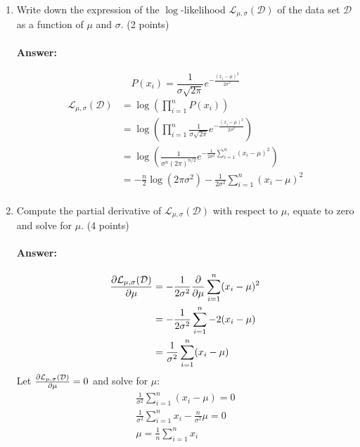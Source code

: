 \documentclass[10pt]{article}
\begin{document}
\begin{enumerate}
  \item Write down the expression of the $\log$-likelihood $\mathcal{L}_{\mu, \sigma}(\mathcal{D})$ of the data set $\mathcal{D}$ as a function of $\mu$ and $\sigma$. (2 points)
  \paragraph{Answer:}
  $$P(x_i) = \frac {1}{\sigma {\sqrt {2\pi }}} e^{-\frac {(x_i-\mu )^{2}}{2\sigma ^{2}}}$$
  \begin{align*}
    \mathcal{L}_{\mu, \sigma}(\mathcal{D}) &= \log{\left(\prod_{i=1}^n P(x_i)\right)}\\
    &= \log{\left(\prod_{i=1}^n \frac {1}{\sigma {\sqrt {2\pi }}} e^{-\frac {(x_i-\mu )^{2}}{2\sigma ^{2}}}\right)}\\
    &= \log{\left(\frac {1}{\sigma^n (2\pi)^{n/2}} e^{-\frac{1}{2\sigma^2}\sum_{i=1}^n (x_i-\mu )^{2}}\right)}\\
    &= \boxed{-\frac{n}{2}\log{(2\pi \sigma^2)}-\frac{1}{2\sigma^2}\sum_{i=1}^n (x_i-\mu )^{2}}\\
  \end{align*}

  \item Compute the partial derivative of $\mathcal{L}_{\mu, \sigma}(\mathcal{D})$ with respect to $\mu$, equate to zero and solve for $\mu$. (4 points)
  \paragraph{Answer:}
  \begin{align*}
    \pdv{\mathcal{L}_{\mu, \sigma}(\mathcal{D})}{\mu } &= -\frac{1}{2\sigma^2}\pdv{}{\mu}\sum_{i=1}^n (x_i-\mu )^{2} \\
    &= -\frac{1}{2\sigma^2}\sum_{i=1}^n -2(x_i-\mu ) \\
    &= \frac{1}{\sigma^2} \sum^n_{i=1} (x_i-\mu) \\
  \end{align*}
  Let $\pdv{\mathcal{L}_{\mu, \sigma}(\mathcal{D})}{\mu }=0$ and solve for $\mu$:
  \begin{align*}
    \frac{1}{\sigma^2} \sum^n_{i=1} (x_i-\mu) = 0\\
    \frac{1}{\sigma^2} \sum^n_{i=1} x_i - \frac{n}{\sigma^2} \mu = 0\\
    \mu = \boxed{\frac{1}{n} \sum^n_{i=1} x_i}\\
  \end{align*}



\end{enumerate}
\end{document}
